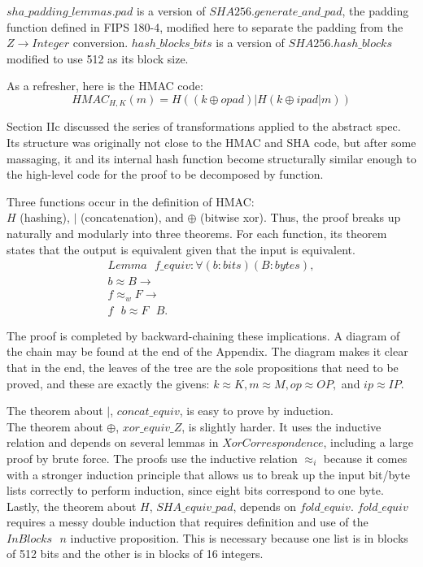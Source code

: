 \documentclass[twocolumn,showpacs,%
  nofootinbib,aps,superscriptaddress,%
  eqsecnum,prd,notitlepage,showkeys,10pt]{revtex4-1}
\newcommand{\eqn}[1] {\begin{gather*}#1\end{gather*}}
\newcommand{\spc} {\textrm{ }}
\newcommand{\s} {\textrm{ }}
\begin{document}
$sha\_padding\_lemmas.pad$ is a version of $SHA256.generate\_and\_pad$, the padding function defined in FIPS 180-4, modified here to separate the padding from the $Z \rightarrow Integer$ conversion. $hash\_blocks\_bits$ is a version of $SHA256.hash\_blocks$ modified to use 512 as its block size. 	

As a refresher, here is the HMAC code:
$$HMAC_{H, K}(m) = H ( (k \oplus opad) | H ( k \oplus ipad | m )  ) $$

Section IIc discussed the series of transformations applied to the abstract spec. Its structure was originally not close to the HMAC and SHA code, but after some massaging, it and its internal hash function become structurally similar enough to the high-level code for the proof to be  decomposed by function.

Three functions occur in the definition of HMAC: \\ $H$ (hashing), $|$ (concatenation), and $\oplus$ (bitwise xor). Thus, the proof breaks up naturally and modularly into three theorems. For each function, its theorem states that the output is equivalent given that the input is equivalent. 
\eqn{
Lemma \s f\_equiv : \forall (b : bits) (B : bytes), \\
b \approx B \rightarrow  \\
f \approx_w F \rightarrow \\
f \spc b \approx F \spc B.}

The proof is completed by backward-chaining these implications. A diagram of the chain may be found at the end of the Appendix. The diagram makes it clear that in the end, the leaves of the tree are the sole propositions that need to be proved, and these are exactly the givens: $k \approx K, m \approx M, op \approx OP,$ and $ip \approx IP$.

The theorem about $|$, $concat\_equiv$, is easy to prove by induction. \\
\indent
The theorem about $\oplus$, $xor\_equiv\_Z$, is slightly harder. It uses the inductive relation and depends on several lemmas in $XorCorrespondence$, including a large proof by brute force. The proofs use the inductive relation $\approx_i$ because it comes with a stronger induction principle that allows us to break up the input bit/byte lists correctly to perform induction, since eight bits correspond to one byte.
\indent
Lastly, the theorem about $H$, $SHA\_equiv\_pad$, depends on $fold\_equiv$. $fold\_equiv$ requires a messy double induction that requires definition and use of the $InBlocks \s n$ inductive proposition. This is necessary because one list is in blocks of 512 bits and the other is in blocks of 16 integers.
\end{document}
